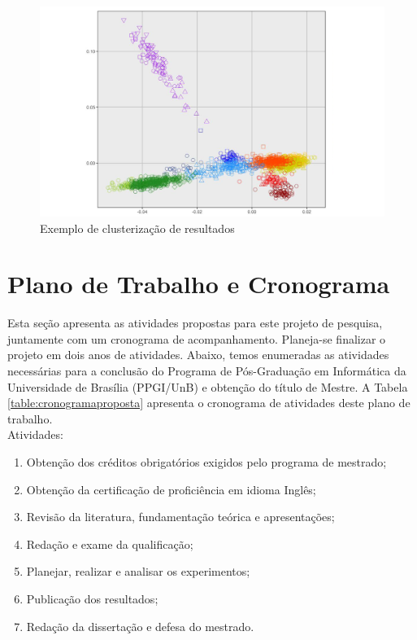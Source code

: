 \clearpage

\begin{figure}[!h]
\centering
\includegraphics[width=1.0\textwidth]{imagens/p-naosupervisionado.png}
\caption{\label{fig:clusterizacaoresults}Exemplo de clusterização de resultados}
\end{figure}

\section{Plano de Trabalho e Cronograma}

Esta seção apresenta as atividades propostas para este projeto de pesquisa, juntamente com um cronograma de acompanhamento. Planeja-se finalizar o projeto em dois anos de atividades. Abaixo, temos enumeradas as atividades necessárias para a conclusão do Programa de Pós-Graduação em Informática da Universidade de Brasília (PPGI/UnB) e obtenção do título de Mestre. A Tabela \ref{table:cronogramaproposta} apresenta o cronograma de atividades deste plano de trabalho.\\

Atividades:

\begin{enumerate}
    \item Obtenção dos créditos obrigatórios exigidos pelo programa de mestrado;
    \item Obtenção da certificação de proficiência em idioma Inglês;
    \item Revisão da literatura, fundamentação teórica e apresentações;
    \item Redação e exame da qualificação;
    \item Planejar, realizar e analisar os experimentos;
    \item Publicação dos resultados;
    \item Redação da dissertação e defesa do mestrado.
\end{enumerate}

